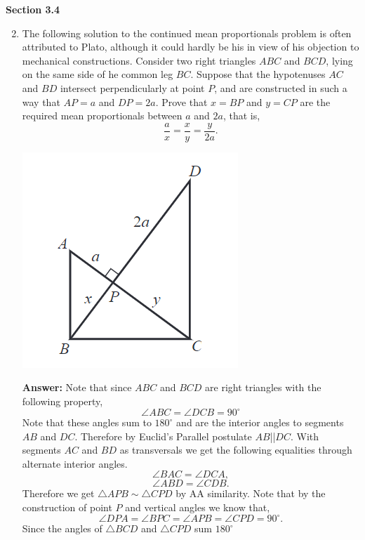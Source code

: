 \documentclass[12pt]{article}
\theoremstyle{homework}
\begin{document}
\textbf{Section 3.4}
\begin{enumerate}
\setcounter{enumi}{1}
\item  The following solution to the continued mean proportionals problem is often attributed to Plato, although
it could hardly be his in view of his objection to mechanical constructions. Consider two right triangles $ABC$ and 
$BCD$, lying on the same side of he common leg $BC$. Suppose that the hypotenuses $AC$ and $BD$ intersect perpendicularly
at point $P$, and are constructed in such a way that $AP= a$ and $DP = 2a$. Prove that $x = BP$ and $y = CP$ are the required mean proportionals between 
$a$ and $2a$, that is, 
\begin{equation*}
  \frac{a}{x} = \frac{x}{y} = \frac{y}{2a}.
\end{equation*}
\begin{center}
  \includegraphics[width = .33\textwidth]{meanprop.png}
\end{center}
\textbf{Answer:} Note that since $ABC$ and $BCD$ are right triangles with the following property, 
\begin{equation*}
  \angle ABC = \angle DCB = 90^{\circ}
\end{equation*}  
Note that these angles sum to $180^{\circ}$ and are the interior angles to segments $AB$ and $DC$. Therefore by Euclid's Parallel postulate 
$AB$||$DC$. With segments $AC$ and $BD$ as transversals we get the following equalities through alternate interior angles.
\begin{equation*}
  \angle BAC = \angle DCA,
\end{equation*}
\begin{equation*}
  \angle ABD = \angle CDB.
\end{equation*}
Therefore we get $\triangle APB \sim \triangle CPD$ by AA similarity. Note that by the construction of point $P$ and vertical angles we know that,
\begin{equation*}
  \angle DPA = \angle BPC = \angle APB = \angle CPD = 90^{\circ}.
\end{equation*}  
Since the angles of  $\triangle BCD$ and $\triangle CPD$ sum $180^{\circ}$

\end{enumerate}
\end{document}
